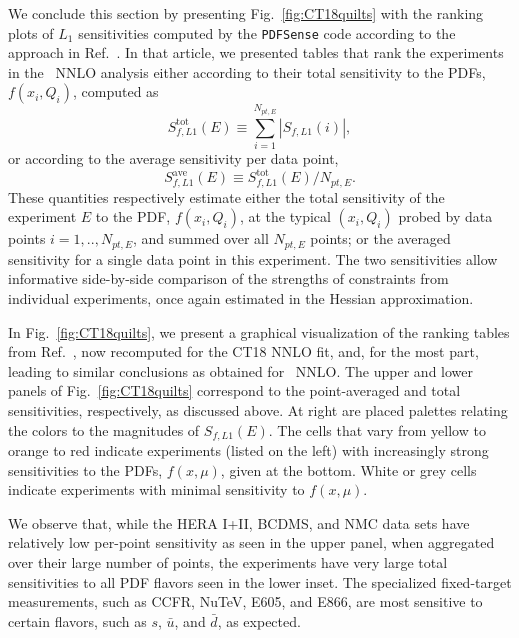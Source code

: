 We conclude this section by presenting 
Fig.~\ref{fig:CT18quilts} with the ranking plots of $L_1$
sensitivities computed by the \texttt{PDFSense} code
according to the approach in Ref.~\cite{Wang:2018heo}.
In that article, we presented tables that
rank the experiments in the \CTHERAII~NNLO analysis either according to
their total sensitivity to the PDFs, $f(x_i,Q_i)$, computed as
\begin{equation}
S_{f,L1}^{\textrm{tot}}(E)\equiv\sum_{i=1}^{N_{pt,E}} \left|S_{f,L1}(i)\right|,
\label{SfL1tot}
\end{equation}
or according to the average sensitivity per data point,
\begin{equation}
S_{f,L1}^{\textrm{ave}}(E)\equiv S_{f,L1}^{\textrm{tot}}(E)/N_{pt,E}.
\label{SfL1ave}
\end{equation}
These quantities respectively
estimate either the total sensitivity of the experiment $E$
to the PDF, $f(x_i,Q_i)$, at the typical $(x_i, Q_i)$ probed by data
points $i=1,..,N_{pt,E}$, and summed over all $N_{pt,E}$ points; or the
averaged sensitivity for a single data point in this experiment.
The two sensitivities allow
informative side-by-side comparison of the strengths of
constraints from individual experiments, once again estimated in the
Hessian approximation.  

In Fig.~\ref{fig:CT18quilts}, we present a graphical visualization of the ranking tables from
Ref.~\cite{Wang:2018heo}, now recomputed for the CT18 NNLO fit, and, for the most part, leading to similar conclusions as obtained for
\CTHERAII~NNLO.  The upper and lower panels of Fig.~\ref{fig:CT18quilts} correspond to the point-averaged and total
sensitivities, respectively, as discussed above. At right are placed palettes
relating the colors to the magnitudes of $S_{f,L1}(E)$.
The cells that vary from yellow to orange to red
indicate experiments (listed on the left)
with increasingly strong sensitivities to the PDFs,
$f(x,\mu)$, given at the bottom.
White or grey cells indicate experiments
with minimal sensitivity to $f(x,\mu)$.

We observe that, while the HERA I+II, BCDMS, and NMC data sets have
relatively low per-point sensitivity as seen in the upper panel,
when aggregated over their large number of points, the experiments have
very large total sensitivities to all PDF flavors
seen in the lower inset. The specialized fixed-target
measurements, such as CCFR, NuTeV, E605, and E866, are most sensitive
to certain flavors, such as $s$, $\bar u$, and $\bar d$, as expected. 

